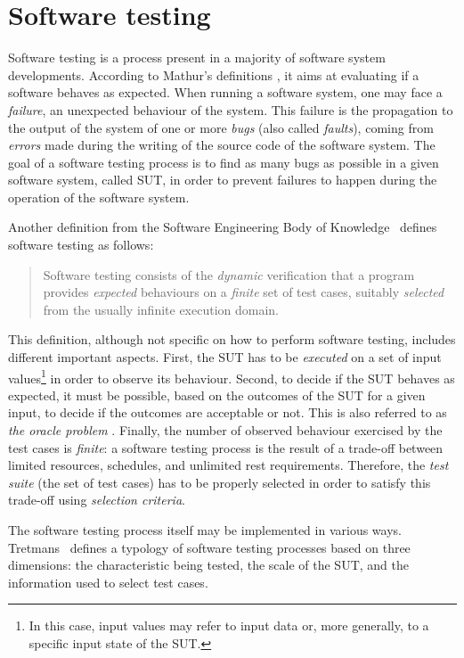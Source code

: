 
\section{Software testing}

Software testing is a process present in a majority of software system developments. According to Mathur's definitions \cite{Mathur2008}, it aims at evaluating if a software behaves as expected. When running a software system, one may face a \emph{\gls{failure}}, \ie an unexpected behaviour of the system. This failure is the propagation to the output of the system of one or more \emph{\glspl{bug}} (also called \emph{\glspl{fault}}), coming from \emph{\glspl{error}} made during the writing of the source code of the software system. The goal of a software testing process is to find as many bugs as possible in a given software system, called \acrfull{SUT}, in order to prevent failures to happen during the operation of the software system.

Another definition from the Software Engineering Body of Knowledge~\cite{swebok2014} defines software testing as follows:
%
\begin{quote}
Software testing consists of the \emph{dynamic} verification that a program provides \emph{expected} behaviours on a \emph{finite} set of test cases, suitably \emph{selected} from the usually infinite execution domain.
\end{quote}
%
This definition, although not specific on how to perform software testing, includes different important aspects. First, the SUT has to be \emph{executed} on a set of input values\footnote{In this case, input values may refer to input data or, more generally, to a specific input state of the SUT.} in order to observe its behaviour. Second, to decide if the SUT behaves as expected, it must be possible, based on the outcomes of the SUT for a given input, to decide if the outcomes are acceptable or not. This is also referred to as \emph{the oracle problem} \cite{swebok2014}. Finally, the number of observed behaviour exercised by the test cases is \emph{finite}: a software testing process is the result of a trade-off between limited resources, schedules, and unlimited rest requirements. Therefore, the \emph{\gls{test suite}} (\ie the set of test cases) has to be properly selected in order to satisfy this trade-off using \emph{\gls{selection criteria}}.

The software testing process itself may be implemented in various ways. Tretmans~\cite{Tretmans2004,Utting2007} defines a typology of software testing processes based on three dimensions: the characteristic being tested, the scale of the SUT, and the information used to select test cases.

